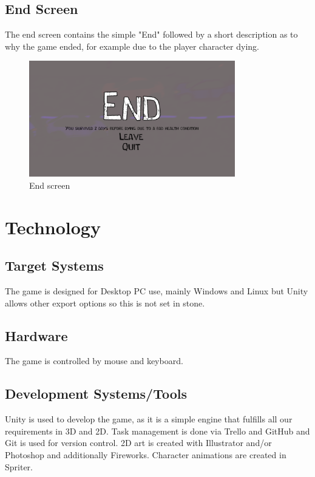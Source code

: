 \documentclass[a4paper]{scrreprt}
\begin{document}
\section{End Screen}
The end screen contains the simple "End" followed by a short description as to why the game ended, for example due to the player character dying.
\begin{figure}[h]
\centering
\includegraphics[width=0.8\textwidth]{end_screen.png}
\caption{\label{fig:end} End screen}
\end{figure}



\chapter{Technology}

\section{Target Systems}
The game is designed for Desktop PC use, mainly Windows and Linux but Unity allows other export options so this is not set in stone.

\section{Hardware}
The game is controlled by mouse and keyboard.

\section{Development Systems/Tools}
Unity is used to develop the game, as it is a simple engine that fulfills all our requirements in 3D and 2D. Task management is done via Trello and GitHub and Git is used for version control. 2D art is created with Illustrator and/or Photoshop and additionally Fireworks. Character animations are created in Spriter.
\end{document}
